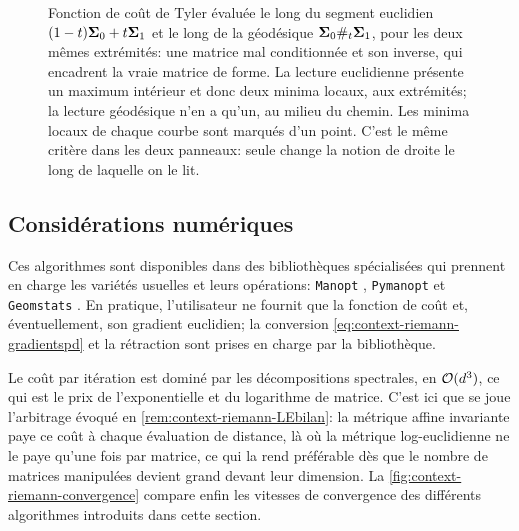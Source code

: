 \begin{figure}[h]
  \begin{center}
    
  \end{center}
  \provGconvexiteQR[.5cm]
  \caption{Fonction de coût de Tyler évaluée le long du segment euclidien
    $(1-t)\boldsymbol{\Sigma}_0+t\boldsymbol{\Sigma}_1$ et le long de la géodésique
    $\boldsymbol{\Sigma}_0\#_t\boldsymbol{\Sigma}_1$, pour les deux mêmes extrémités: une matrice
    mal conditionnée et son inverse, qui encadrent la vraie matrice de forme.
    La lecture euclidienne présente un maximum intérieur et donc deux minima
    locaux, aux extrémités; la lecture géodésique n'en a qu'un, au milieu du
    chemin. Les minima locaux de chaque courbe sont marqués d'un point. C'est le même critère dans les deux panneaux: seule change la
    notion de droite le long de laquelle on le lit. \provGconvexite}
  \label{fig:context-riemann-gconvexite}
\end{figure}

\subsection{Considérations numériques}

Ces algorithmes sont disponibles dans des bibliothèques spécialisées qui prennent en charge les variétés usuelles et leurs opérations: \texttt{Manopt} , \texttt{Pymanopt}  et \texttt{Geomstats} . En pratique, l'utilisateur ne fournit que la fonction de coût et, éventuellement, son gradient euclidien; la conversion \cref{eq:context-riemann-gradientspd} et la rétraction sont prises en charge par la bibliothèque.

Le coût par itération est dominé par les décompositions spectrales, en $\mathcal{O}(d^3)$, ce qui est le prix de l'exponentielle et du logarithme de matrice. C'est ici que se joue l'arbitrage évoqué en \cref{rem:context-riemann-LEbilan}: la métrique affine invariante paye ce coût à chaque évaluation de distance, là où la métrique log-euclidienne ne le paye qu'une fois par matrice, ce qui la rend préférable dès que le nombre de matrices manipulées devient grand devant leur dimension. La \cref{fig:context-riemann-convergence} compare enfin les vitesses de convergence des différents algorithmes introduits dans cette section.

